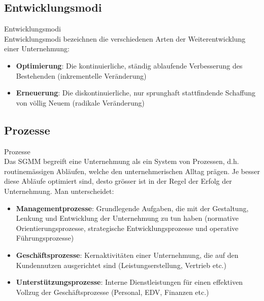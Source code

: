 \subsection{Entwicklungsmodi}

\begin{definition}{Entwicklungsmodi}\\
Entwicklungsmodi bezeichnen die verschiedenen Arten der Weiterentwicklung einer Unternehmung:
\begin{itemize}
    \item \textbf{Optimierung}: Die kontinuierliche, ständig ablaufende Verbesserung des Bestehenden (inkrementelle Veränderung)
    \item \textbf{Erneuerung}: Die diskontinuierliche, nur sprunghaft stattfindende Schaffung von völlig Neuem (radikale Veränderung)
\end{itemize}
\end{definition}

\subsection{Prozesse}

\begin{definition}{Prozesse}\\
Das SGMM begreift eine Unternehmung als ein System von Prozessen, d.h. routinemässigen Abläufen, welche den unternehmerischen Alltag prägen. Je besser diese Abläufe optimiert sind, desto grösser ist in der Regel der Erfolg der Unternehmung. Man unterscheidet:
\begin{itemize}
    \item \textbf{Managementprozesse}: Grundlegende Aufgaben, die mit der Gestaltung, Lenkung und Entwicklung der Unternehmung zu tun haben (normative Orientierungsprozesse, strategische Entwicklungsprozesse und operative Führungsprozesse)
    \item \textbf{Geschäftsprozesse}: Kernaktivitäten einer Unternehmung, die auf den Kundennutzen ausgerichtet sind (Leistungserstellung, Vertrieb etc.)
    \item \textbf{Unterstützungsprozesse}: Interne Dienstleistungen für einen effektiven Vollzug der Geschäftsprozesse (Personal, EDV, Finanzen etc.)
\end{itemize}
\end{definition}